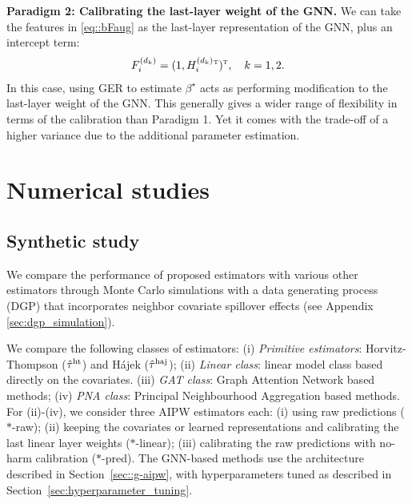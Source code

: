 \documentclass{article}
\theoremstyle{plain}
\theoremstyle{definition}
\theoremstyle{remark}
\def\T{{\textsc{t}}}
\newcommand{\indicator}{\mathbbm{1}}
\newcommand{\hort}{\textup{ht}}
\newcommand{\haj}{\textup{haj}}
\begin{document}
\textbf{Paradigm 2: Calibrating the last-layer weight of the GNN.} We can take the features in \eqref{eq::bFaug} as the last-layer representation of the GNN, plus an intercept term:
\begin{align*}
    F_i^{(d_k)} = (1, H_i^{(d_k)}{}^\T)^\T, \quad k=1,2.
\end{align*}
In this case, using GER to estimate $\beta^\star$ acts as performing modification to the last-layer weight of the GNN. This generally gives a wider range of flexibility in terms of the calibration than Paradigm 1. Yet it comes with the trade-off of a higher variance due to the additional parameter estimation.



\section{Numerical studies}
\subsection{Synthetic study}
\label{sec:simulation}

We compare the performance of proposed estimators with various other estimators through Monte Carlo simulations with a data generating process (DGP) that incorporates neighbor covariate spillover effects (see Appendix \ref{sec:dgp_simulation}). 

We compare the following classes of estimators: (i) \emph{Primitive estimators}: Horvitz-Thompson ($\hat\tau^{\hort}$) and H\'{a}jek ($\hat\tau^{\haj}$); (ii) \emph{Linear class}: linear model class based directly on the covariates. (iii)  \emph{GAT class}: Graph Attention Network based methods; (iv) \emph{PNA class}: Principal Neighbourhood Aggregation based methods. For (ii)-(iv), we consider three AIPW estimators each: (i) using raw predictions ($*$-raw); (ii) keeping the covariates or learned representations and calibrating the last linear layer weights ($*$-linear); (iii) calibrating the raw predictions with no-harm calibration ($*$-pred). The GNN-based methods use the architecture described in Section~\ref{sec::g-aipw}, with hyperparameters tuned as described in Section~\ref{sec:hyperparameter_tuning}. 
\end{document}
